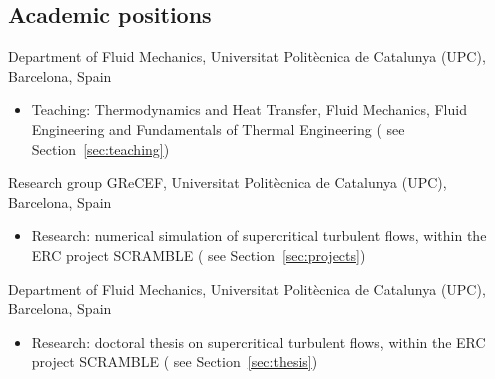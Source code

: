 \documentclass[11pt]{article}
\begin{document}
\subsection{Academic positions}
\begin{entries}
    {Department of Fluid Mechanics, Universitat Polit\`ecnica de Catalunya (UPC),
    Barcelona, Spain}
  \begin{itemize}
    \item Teaching: Thermodynamics and Heat Transfer, Fluid Mechanics, Fluid Engineering
    and Fundamentals of Thermal Engineering ( \docsep see
    Section~\ref{sec:teaching})
  \end{itemize}

    {Research group GReCEF, Universitat Polit\`ecnica de Catalunya (UPC), Barcelona, Spain}
  \begin{itemize}
    \item Research: numerical simulation of supercritical turbulent flows, within the ERC
    project SCRAMBLE ( \docsep see
    Section~\ref{sec:projects})
  \end{itemize}

    {Department of Fluid Mechanics, Universitat Polit\`ecnica de Catalunya (UPC),
    Barcelona, Spain}
  \begin{itemize}
    \item Research: doctoral thesis on supercritical turbulent flows, within the ERC
    project SCRAMBLE (
    \docsep see Section~\ref{sec:thesis})
  \end{itemize}
\end{entries}
\end{document}
